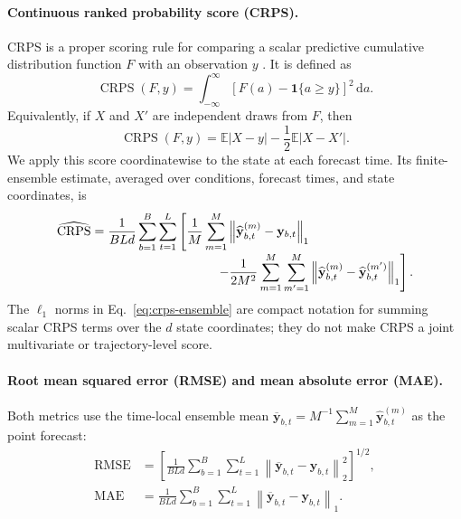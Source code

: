 \paragraph{Continuous ranked probability score (CRPS).}
CRPS is a proper scoring rule for comparing a scalar predictive cumulative
distribution function $F$ with an observation $y$
\citep{gneiting2007strictly, waghmare2025proper}.  It is defined as
\begin{equation}
  \operatorname{CRPS}(F,y)
  =
  \int_{-\infty}^{\infty}
  \left[F(a)-\mathbf{1}\{a\geq y\}\right]^2\,\mathrm{d}a.
  \label{eq:crps-cdf}
\end{equation}
Equivalently, if $X$ and $X'$ are independent draws from $F$, then
\begin{equation}
  \operatorname{CRPS}(F,y)
  =
  \mathbb{E}|X-y|
  -\frac{1}{2}\mathbb{E}|X-X'|.
  \label{eq:crps-expectation}
\end{equation}
We apply this score coordinatewise to the state at each forecast time. Its
finite-ensemble estimate, averaged over conditions, forecast times, and state
coordinates, is
\begin{equation}
  \begin{aligned}
    \widehat{\operatorname{CRPS}}
    ={}&
    \frac{1}{BLd}\sum_{b=1}^{B}\sum_{t=1}^{L}
    \left[
      \frac{1}{M}\sum_{m=1}^{M}
      \left\|\widehat{\mathbf y}_{b,t}^{(m)}-\mathbf y_{b,t}\right\|_1
    \right.\\[-1mm]
    &\left.\hspace{30mm}
      -\frac{1}{2M^2}\sum_{m=1}^{M}\sum_{m'=1}^{M}
      \left\|\widehat{\mathbf y}_{b,t}^{(m)}-
      \widehat{\mathbf y}_{b,t}^{(m')}\right\|_1
    \right].
  \end{aligned}
  \label{eq:crps-ensemble}
\end{equation}
The $\ell_1$ norms in Eq.~\ref{eq:crps-ensemble} are compact notation for
summing scalar CRPS terms over the $d$ state coordinates; they do not make
CRPS a joint multivariate or trajectory-level score.

\paragraph{Root mean squared error (RMSE) and mean absolute error (MAE).}
Both metrics use the time-local ensemble mean
$\overline{\mathbf y}_{b,t}=M^{-1}\sum_{m=1}^{M}
\widehat{\mathbf y}_{b,t}^{(m)}$ as the point forecast:
\begin{equation}
  \begin{aligned}
    \operatorname{RMSE}
    &=
    \left[
      \frac{1}{BLd}\sum_{b=1}^{B}\sum_{t=1}^{L}
      \left\|\overline{\mathbf y}_{b,t}-\mathbf y_{b,t}\right\|_2^2
    \right]^{1/2},\\
    \operatorname{MAE}
    &=
    \frac{1}{BLd}\sum_{b=1}^{B}\sum_{t=1}^{L}
    \left\|\overline{\mathbf y}_{b,t}-\mathbf y_{b,t}\right\|_1.
  \end{aligned}
  \label{eq:rmse-mae}
\end{equation}

